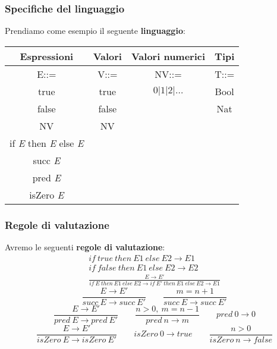 \subsubsection{Specifiche del linguaggio}
Prendiamo come esempio il seguente \textbf{linguaggio}:\\
\begin{center}
	\begin{tabular}{|c|c|c|c|}
		\hline
		\textbf{Espressioni} & \textbf{Valori} & \textbf{Valori numerici} & \textbf{Tipi} \\
		\hline
		E::= & V::= & NV::= & T::= \\
		true & true & $0 \vert 1 \vert 2 \vert \ldots$ & Bool \\
		false & false & & Nat \\
		NV & NV & &\\
		if \textit{E} then \textit{E} else \textit{E} & &  &\\
		succ \textit{E} & & &\\
		pred \textit{E} & & &\\
		isZero \textit{E} & & &\\
		\hline
	\end{tabular}
\end{center}
\subsubsection{Regole di valutazione}
Avremo le seguenti \textbf{regole di valutazione}:\\
\begin{gather}
		if \: true \: then \: E1 \: else \: E2 \rightarrow E1 \\
		if \: false \: then \: E1 \: else \: E2 \rightarrow E2 \\
		\frac{E \rightarrow E'}{if \: E \: then \: E1 \: else \: E2 \rightarrow if \: E'  \: then \: E1 \: else \: E2 \rightarrow E1} \label{eq:if_stepfw}
\end{gather}
\begin{equation}
	\frac{E \rightarrow E'}{succ \: E \rightarrow succ \: E'} \qquad
	\frac{m = n+1}{succ \: E \rightarrow succ \: E'}
\end{equation}
\begin{equation}
	\frac{E \rightarrow E'}{pred \: E \rightarrow pred \: E'} \qquad
	\frac{ n>0,\: m=n-1}{pred \: n \rightarrow m} \qquad
	pred \: 0 \rightarrow 0
\end{equation}
\begin{equation}
	\frac{E \rightarrow E'}{isZero \: E \rightarrow isZero \: E'} \qquad isZero \: 0 \rightarrow true \qquad \frac{n>0}{isZero \: n \rightarrow false}
\end{equation}
